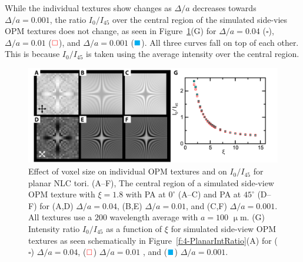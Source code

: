 While the individual textures show changes as $\Delta /a$ decreases towards $\Delta /a = 0.001$, the ratio $I_0/I_{45}$ over the central region of the simulated side-vies OPM textures does not change, as seen in Figure~\ref{f:4-PlanarVoxel}(G) for $\Delta /a = 0.04$ ($\square$), $\Delta /a = 0.01$ (${\color{red}\square}$), and $\Delta /a = 0.001$ (${\color{cyan}\blacksquare}$).
All three curves fall on top of each other.
This is because $I_0/I_{45}$ is taken using the average intensity over the central region.
\begin{figure}
\centering
\includegraphics{figures/C4/Ch4-Figs_SimDeltaTest.png}
\caption{Effect of voxel size on individual OPM textures and on $I_0/I_{45}$ for planar NLC tori.
(A--F), The central region of a simulated side-view OPM texture with $\xi = 1.8$ with PA at $0^{\circ}$ (A--C) and PA at $45^{\circ}$ (D--F) for (A,D) $\Delta /a = 0.04$, (B,E) $\Delta /a = 0.01$, and (C,F) $\Delta /a = 0.001$.
All textures use a $200$ wavelength average with $a = 100$ $\upmu$m.
(G) Intensity ratio $I_0/I_{45}$ as a function of $\xi$ for simulated side-view OPM textures as seen schematically in Figure~\ref{f:4-PlanarIntRatio}(A) for ($\square$) $\Delta /a = 0.04$, (${\color{red}\square}$) $\Delta /a = 0.01$ , and (${\color{cyan}\blacksquare}$) $\Delta /a = 0.001$.
}\label{f:4-PlanarVoxel}
\end{figure}

